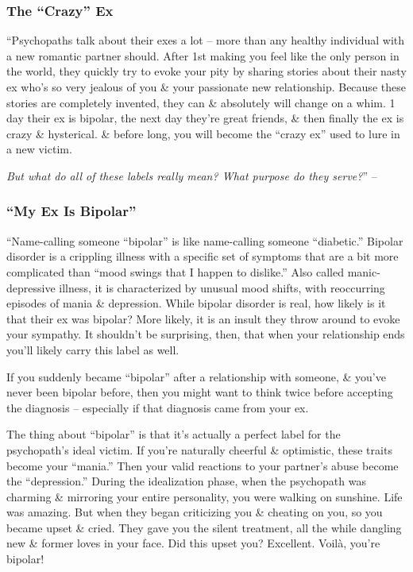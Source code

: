 \documentclass{article}
\numberwithin{equation}{section}
\begin{document}
\subsubsection{The ``Crazy'' Ex}
``Psychopaths talk about their exes a lot -- more than any healthy individual with a new romantic partner should. After 1st making you feel like the only person in the world, they quickly try to evoke your pity by sharing stories about their nasty ex who's so very jealous of you \& your passionate new relationship. Because these stories are completely invented, they can \& absolutely will change on a whim. 1 day their ex is bipolar, the next day they're great friends, \& then finally the ex is crazy \& hysterical. \& before long, you will become the ``crazy ex'' used to lure in a new victim.

\textit{But what do all of these labels really mean? What purpose do they serve?}'' -- \cite[p. 32]{MacKenzie2015}

\subsubsection{``My Ex Is Bipolar''}
``Name-calling someone ``bipolar'' is like name-calling someone ``diabetic.'' Bipolar disorder is a crippling illness with a specific set of symptoms that are a bit more complicated than ``mood swings that I happen to dislike.'' Also called manic-depressive illness, it is characterized by unusual mood shifts, with reoccurring episodes of mania \& depression. While bipolar disorder is real, how likely is it that their ex was bipolar? More likely, it is an insult they throw around to evoke your sympathy. It shouldn't be surprising, then, that when your relationship ends you'll likely carry this label as well.

If you suddenly became ``bipolar'' after a relationship with someone, \& you've never been bipolar before, then you might want to think twice before accepting the diagnosis -- especially if that diagnosis came from your ex.

The thing about ``bipolar'' is that it's actually a perfect label for the psychopath's ideal victim. If you're naturally cheerful \& optimistic, these traits become your ``mania.'' Then your valid reactions to your partner's abuse become the ``depression.'' During the idealization phase, when the psychopath was charming \& mirroring your entire personality, you were walking on sunshine. Life was amazing. But when they began criticizing you \& cheating on you, so you became upset \& cried. They gave you the silent treatment, all the while dangling new \& former loves in your face. Did this upset you? Excellent. Voil\`a, you're bipolar!
\end{document}
